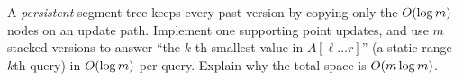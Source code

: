 \begin{exercise}
\label{ch23:ex-persistent}
A \emph{persistent} segment tree keeps every past version by copying only the $O(\log m)$
nodes on an update path. Implement one supporting point updates, and use $m$ stacked versions
to answer ``the $k$-th smallest value in $A[\ell\ldots r]$'' (a static range-$k$th query) in
$O(\log m)$ per query. Explain why the total space is $O(m\log m)$.
\end{exercise}
